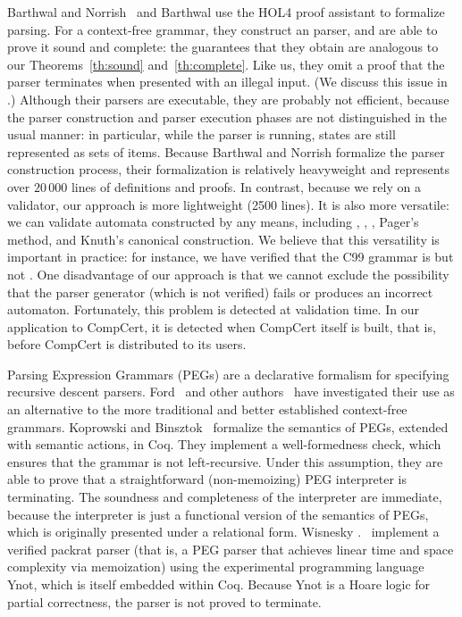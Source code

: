 \documentclass{llncs}
\begin{document}
Barthwal and Norrish~\citeyear{barthwal-norrish-09} and
Barthwal \cite{Barthwal-phd} use the HOL4 proof assistant to
formalize \slr~\cite{deremer-slr-71} parsing. For a context-free grammar, they
construct an \slr parser, and are able to prove it sound and complete: the
guarantees that they obtain are analogous to our Theorems~\ref{th:sound}
and~\ref{th:complete}. Like us, they omit a proof that the
parser terminates when presented with an illegal input. (We discuss this
issue in .)
%
Although their parsers are executable, they are probably not efficient,
because the parser construction and parser execution phases are not
distinguished in the usual manner: in particular, while the parser is running,
states are still represented as sets of \lrone items.
Because Barthwal and Norrish formalize the parser construction process, their
formalization is relatively heavyweight and represents over $20\,000$
lines of definitions and proofs. In contrast, because we rely on a validator,
our approach is more lightweight (2500 lines).
It is also more versatile: we can validate \lrone automata constructed by any
means, including \lrzero, \slr, \lalr, Pager's method, and Knuth's
canonical \lrone construction. We believe that this versatility is important
in practice: for instance, we have verified that the C99 grammar is \lalr but
not \slr.
One disadvantage of our approach is that we cannot exclude the possibility
that the parser generator (which is not verified) fails or produces an
incorrect automaton. Fortunately, this problem is detected at validation
time. In our application to CompCert, it is detected when CompCert itself is
built, that is, before CompCert is distributed to its users.

Parsing Expression Grammars (PEGs) are a declarative formalism for specifying
recursive descent parsers. Ford~\cite{ford-02,ford-04} and other
authors~\cite{warth-douglass-millstein-08} have investigated their use as an
alternative to the more traditional and better established context-free
grammars.
%
Koprowski and Binsztok~\cite{koprowski-binsztok-11} formalize the semantics of
PEGs, extended with semantic actions, in Coq. They implement a well-formedness
check, which ensures that the grammar is not left-recursive. Under this
assumption, they are able to prove that a straightforward (non-memoizing) PEG
interpreter is terminating. The soundness and completeness of the interpreter
are immediate, because the interpreter is just a functional version of the
semantics of PEGs, which is originally presented under a relational form.
Wisnesky \etal.~\citeyear{wisnesky-malecha-morrisett-09} implement a verified
packrat parser (that is, a PEG parser that achieves linear time and space
complexity via memoization) using the experimental programming language Ynot,
which is itself embedded within Coq. Because Ynot is a Hoare logic for partial
correctness, the parser is not proved to terminate.
\end{document}
